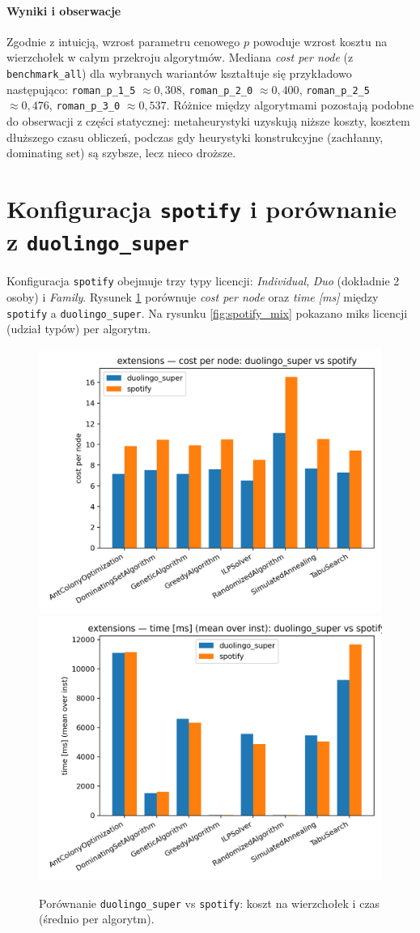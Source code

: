 \paragraph{Wyniki i obserwacje}
Zgodnie z intuicją, wzrost parametru cenowego $p$ powoduje wzrost kosztu na wierzchołek w całym przekroju algorytmów. Mediana \textit{cost per node} (z \texttt{benchmark\_all}) dla wybranych wariantów kształtuje się przykładowo następująco: \texttt{roman\_p\_1\_5} $\approx0{,}308$, \texttt{roman\_p\_2\_0} $\approx0{,}400$, \texttt{roman\_p\_2\_5} $\approx0{,}476$, \texttt{roman\_p\_3\_0} $\approx0{,}537$. Różnice między algorytmami pozostają podobne do obserwacji z części statycznej: metaheurystyki uzyskują niższe koszty, kosztem dłuższego czasu obliczeń, podczas gdy heurystyki konstrukcyjne (zachłanny, dominating set) są szybsze, lecz nieco droższe.

\section{Konfiguracja \texttt{spotify} i porównanie z \texttt{duolingo\_super}}

Konfiguracja \texttt{spotify} obejmuje trzy typy licencji: \emph{Individual}, \emph{Duo} (dokładnie 2 osoby) i \emph{Family}. Rysunek \ref{fig:duo_spotify_cmp} porównuje \textit{cost per node} oraz \textit{time [ms]} między \texttt{spotify} a \texttt{duolingo\_super}. Na rysunku \ref{fig:spotify_mix} pokazano miks licencji (udział typów) per algorytm.

\begin{figure}[H]
  \centering
  \includegraphics[width=0.48\linewidth]{assets/figures/extensions/duo_vs_spotify/compare_cost_per_node_duolingo_super_vs_spotify.png}
  \includegraphics[width=0.48\linewidth]{assets/figures/extensions/duo_vs_spotify/compare_time_ms_duolingo_super_vs_spotify.png}
  \caption{Porównanie \texttt{duolingo\_super} vs \texttt{spotify}: koszt na wierzchołek i czas (średnio per algorytm).}
  \label{fig:duo_spotify_cmp}
\end{figure}

